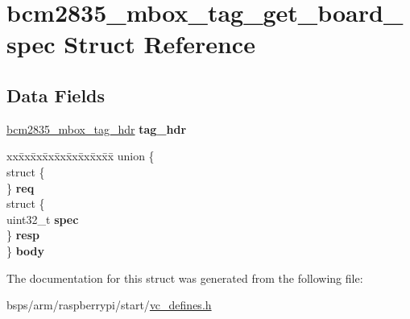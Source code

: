 \hypertarget{structbcm2835__mbox__tag__get__board__spec}{}\section{bcm2835\+\_\+mbox\+\_\+tag\+\_\+get\+\_\+board\+\_\+spec Struct Reference}
\label{structbcm2835__mbox__tag__get__board__spec}
\subsection*{Data Fields}
\begin{DoxyCompactItemize}
\item 
\mbox{\label{structbcm2835__mbox__tag__get__board__spec_a0319d84dbfbf1efb146680d469649bfd}} 
\mbox{\hyperlink{structbcm2835__mbox__tag__hdr}{bcm2835\+\_\+mbox\+\_\+tag\+\_\+hdr}} {\bfseries tag\+\_\+hdr}
\item 
\mbox{\label{structbcm2835__mbox__tag__get__board__spec_a27af9753b191cc2f5aa46b01c0733fb7}} 
\begin{tabbing}
xx\=xx\=xx\=xx\=xx\=xx\=xx\=xx\=xx\=\kill
union \{\\
\>struct \{\\
\>\} {\bfseries req}\\
\>struct \{\\
\>\>uint32\_t {\bfseries spec}\\
\>\} {\bfseries resp}\\
\} {\bfseries body}\\

\end{tabbing}\end{DoxyCompactItemize}


The documentation for this struct was generated from the following file\+:\begin{DoxyCompactItemize}
\item 
bsps/arm/raspberrypi/start/\mbox{\hyperlink{vc__defines_8h}{vc\+\_\+defines.\+h}}\end{DoxyCompactItemize}
